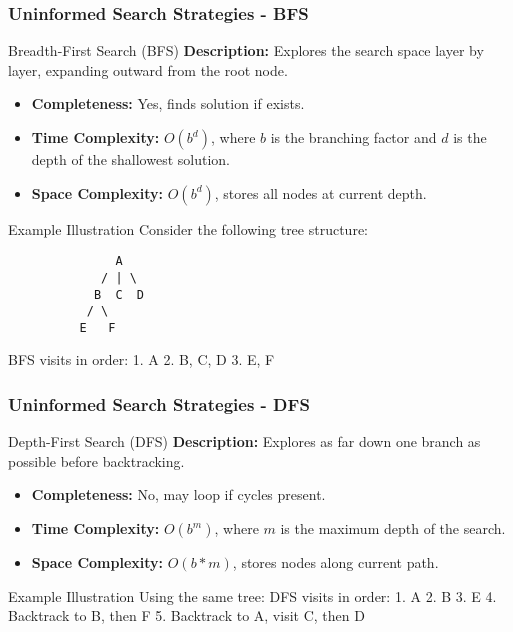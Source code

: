 \documentclass[aspectratio=169]{beamer}
\begin{document}
\begin{frame}[fragile]
    \frametitle{Uninformed Search Strategies - BFS}
    \begin{block}{Breadth-First Search (BFS)}
        \textbf{Description:} Explores the search space layer by layer, expanding outward from the root node.
    \end{block}

    \begin{itemize}
        \item \textbf{Completeness:} Yes, finds solution if exists.
        \item \textbf{Time Complexity:} $O(b^d)$, where $b$ is the branching factor and $d$ is the depth of the shallowest solution.
        \item \textbf{Space Complexity:} $O(b^d)$, stores all nodes at current depth.
    \end{itemize}

    \begin{block}{Example Illustration}
        Consider the following tree structure:
        \begin{verbatim}
               A
             / | \
            B  C  D
           / \
          E   F
        \end{verbatim}
        BFS visits in order: 1. A 2. B, C, D 3. E, F
    \end{block}
\end{frame}

\begin{frame}[fragile]
    \frametitle{Uninformed Search Strategies - DFS}
    \begin{block}{Depth-First Search (DFS)}
        \textbf{Description:} Explores as far down one branch as possible before backtracking.
    \end{block}

    \begin{itemize}
        \item \textbf{Completeness:} No, may loop if cycles present.
        \item \textbf{Time Complexity:} $O(b^m)$, where $m$ is the maximum depth of the search.
        \item \textbf{Space Complexity:} $O(b*m)$, stores nodes along current path.
    \end{itemize}

    \begin{block}{Example Illustration}
        Using the same tree:
        DFS visits in order: 1. A 2. B 3. E 4. Backtrack to B, then F 5. Backtrack to A, visit C, then D
    \end{block}
\end{frame}
\end{document}
